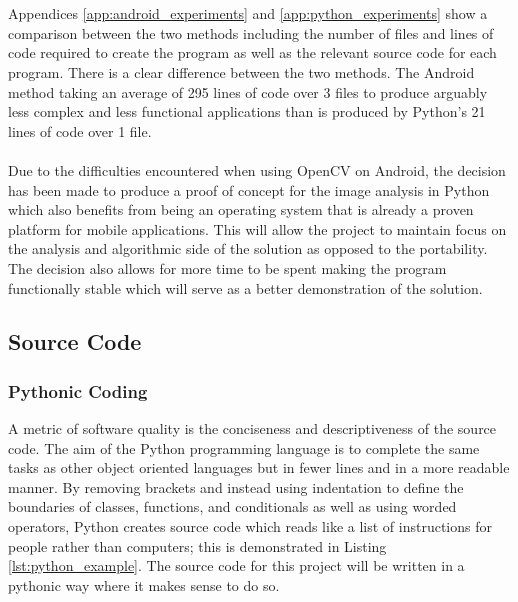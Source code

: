 		\\\\
		Appendices \ref{app:android_experiments} and \ref{app:python_experiments} show  a comparison between the two methods including the  number of files and lines of code required to create the program as well as the relevant source code for each program. There is a clear difference between the two methods. The Android method taking an average of 295 lines of code over 3 files to produce arguably less complex and less functional applications than is produced by Python’s 21 lines of code over 1 file.
		\\\\
		Due to the difficulties encountered when using OpenCV on Android,  the decision has been made to produce a proof of concept for the image analysis in Python which also benefits from being an  operating system that is already a proven platform for mobile applications. This will allow the project to maintain focus on the analysis and algorithmic side of the solution  as opposed to the portability. The decision also allows for more time to be spent making the program functionally stable which will serve as a better demonstration of the solution.
	\subsection{Source Code}
		\subsubsection{Pythonic Coding}
			A metric of software quality is the conciseness and descriptiveness of the source code. The aim of the Python programming language is to complete the same tasks as other object oriented languages but in fewer lines and in a more readable manner. By removing brackets and instead using indentation to define the boundaries of classes, functions, and conditionals as well as using worded operators, Python creates source code which reads like a list of instructions for people rather than computers; this is demonstrated in Listing \ref{lst:python_example}. The source code for this project will be written in a pythonic way where it makes sense to do so.
